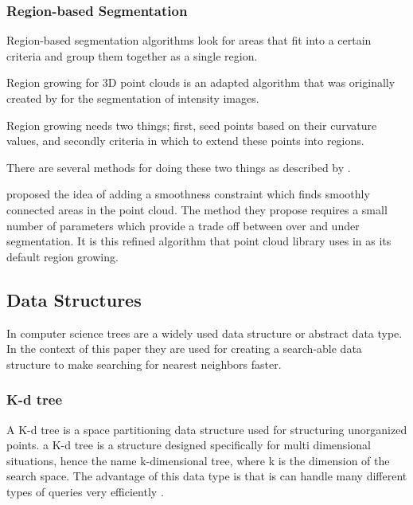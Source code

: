 			
		\subsubsection{Region-based Segmentation}
			Region-based segmentation algorithms look for areas that fit into a certain criteria and group them together as a single region.
			
			Region growing for 3D point clouds is an adapted algorithm that was originally created by \cite{adams_seeded_1994} for the segmentation of intensity images.
			
			Region growing needs two things; first, seed points based on their curvature values, and secondly criteria in which to extend these points into regions.
			
			There are several methods for doing these two things as described by \cite{hoover_experimental_1996}.		
			
			\cite{rabbani_segmentation_2006} proposed the idea of adding a smoothness constraint which finds smoothly connected areas in the point cloud. The method they propose requires a small number of parameters which provide a trade off between over and under segmentation. It is this refined algorithm that point cloud library uses in as its default region growing.
			
			
	\subsection{Data Structures}
		In computer science trees are a widely used data structure or abstract data type. In the context of this paper they are used for creating a search-able data structure to make searching for nearest neighbors faster.
		
		\subsubsection{K-d tree}
			A K-d tree is a space partitioning data structure used for structuring unorganized points. a K-d tree is a structure designed specifically for multi dimensional situations, hence the name k-dimensional tree, where k is the dimension of the search space. The advantage of this data type is that is can handle many different types of queries very efficiently \citep{bentley_multidimensional_1975}.
			
			
			
	
			
			
			
			
	
